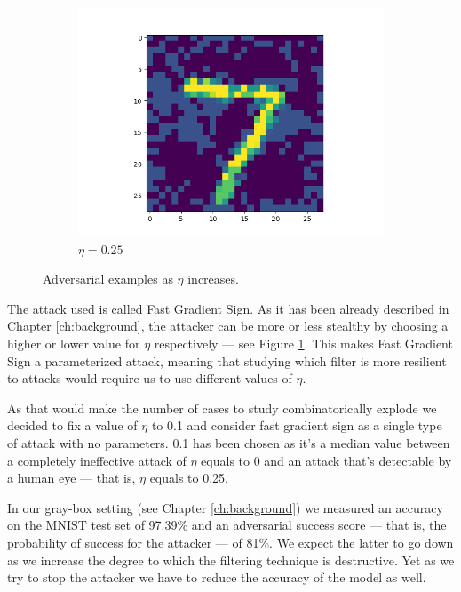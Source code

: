 \begin{figure}
\begin{subfigure}{0.3\linewidth}
    \includegraphics[width=\linewidth]{adversarial-input-fc-100-100-10-025.png}
    \caption{$\eta = 0.25$}
  \end{subfigure}
  \caption{Adversarial examples as $\eta$ increases.}
  \label{fig:fgs-increasing-eta}
\end{figure}

The attack used is called Fast Gradient Sign. As it has been already
described in Chapter \ref{ch:background}, the attacker can be more or
less stealthy by choosing a higher or lower value for $\eta$
respectively --- see Figure \ref{fig:fgs-increasing-eta}. This makes
Fast Gradient Sign a parameterized attack, meaning that studying which
filter is more resilient to attacks would require us to use different
values of $\eta$.

As that would make the number of cases to study
combinatorically explode we decided to fix a value of $\eta$ to 0.1 and
consider fast gradient sign as a single type of attack with no
parameters. 0.1 has been chosen as it's a median value
between a completely ineffective attack of $\eta$ equals to 0 and an
attack that's detectable by a human eye --- that is, $\eta$ equals
to 0.25.

In our gray-box setting (see Chapter \ref{ch:background}) we measured
an accuracy on the MNIST test set of 97.39\% and an adversarial success
score --- that is, the probability of success for the attacker --- of
81\%. We expect the latter to go down as we increase the degree
to which the filtering technique is destructive. Yet as we try to stop the
attacker we have to reduce the accuracy of the model as well.

